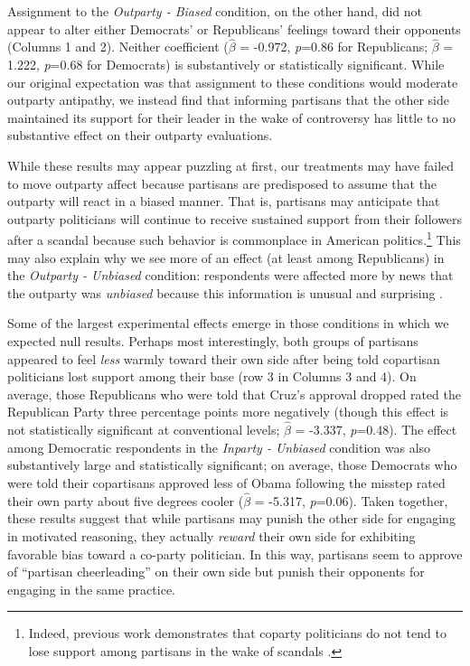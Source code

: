 \documentclass[12pt, letterpaper]{article}
\begin{document}
\bigskip
Assignment to the \textit{Outparty - Biased} condition, on the other hand, did not appear to alter either Democrats' or Republicans' feelings toward their opponents (Columns 1 and 2). Neither coefficient ($\hat{\beta}$ = -0.972, \textit{p}=0.86 for Republicans; $\hat{\beta}$ = 1.222, \textit{p}=0.68 for Democrats) is substantively or statistically significant. While our original expectation was that assignment to these conditions would moderate outparty antipathy, we instead find that informing partisans that the other side maintained its support for their leader in the wake of controversy has little to no substantive effect on their outparty evaluations. 

While these results may appear puzzling at first, our treatments may have failed to move outparty affect because partisans are predisposed to assume that the outparty will react in a biased manner. That is, partisans may anticipate that outparty politicians will continue to receive sustained support from their followers after a scandal because such behavior is commonplace in American politics.\footnote{Indeed, previous work demonstrates that coparty politicians do not tend to lose support among partisans in the wake of scandals \citep{ahlersood_2014}.} This may also explain why we see more of an effect (at least among Republicans) in the \textit{Outparty - Unbiased} condition: respondents were affected more by news that the outparty was \textit{unbiased} because this information is unusual and surprising \citep[e.g.,][]{maheswaranchaiken_2011}.

Some of the largest experimental effects emerge in those conditions in which we expected null results. Perhaps most interestingly, both groups of partisans appeared to feel \textit{less} warmly toward their own side after being told copartisan politicians lost support among their base (row 3 in Columns 3 and 4). On average, those Republicans who were told that Cruz's approval dropped rated the Republican Party three percentage points more negatively (though this effect is not statistically significant at conventional levels; $\hat{\beta}$ = -3.337, \textit{p}=0.48). The effect among Democratic respondents in the \textit{Inparty - Unbiased} condition was also substantively large and statistically significant; on average, those Democrats who were told their copartisans approved less of Obama following the misstep rated their own party about five degrees cooler ($\hat{\beta}$ = -5.317, \textit{p}=0.06). Taken together, these results suggest that while partisans may punish the other side for engaging in motivated reasoning, they actually \textit{reward} their own side for exhibiting favorable bias toward a co-party politician. In this way, partisans seem to approve of ``partisan cheerleading'' \citep{bullocketal_2015} on their own side but punish their opponents for engaging in the same practice. 
\end{document}
